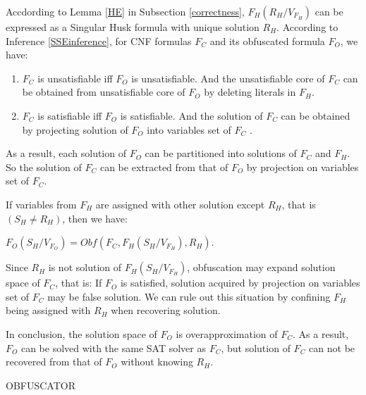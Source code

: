 \documentclass[conference,compsocconf]{IEEEtran}
\begin{document}
Accdording to Lemma \ref{HE} in Subsection \ref{correctness}, 
$F_H(R_H/V_{F_H})$ can be expressed as a Singular Husk formula with unique solution $R_H$.
According to Inference \ref{SSEinference}, for CNF formulas $F_C$  and its obfuscated formula $F_O$, we have:
\begin{enumerate}
 \item $F_C$  is unsatisfiable iff $F_O$ is unsatisfiable.
 And the unsatisfiable core of $F_C$  can be obtained from unsatisfiable core of $F_O$ by deleting literals in $F_H$.
 \item $F_C$  is satisfiable iff $F_O$ is satisfiable.
 And the solution of $F_C$  can be obtained by projecting solution of $F_O$ into variables set of $F_C$ .
\end{enumerate}

As a result, each solution of $F_O$ can be partitioned into solutions of $F_C$ and $F_H$. So
the solution of $F_C$ can be extracted from that of $F_O$ by projection on variables set of $F_C$.

If variables from $F_H$ are assigned with other solution except $R_H$, that is $(S_H\neq R_H)$, then we have:

$F_O(S_H/V_{F_O})
=Obf(F_C,F_H(S_H/V_{F_H}),R_H)$.

Since $R_H$ is not solution of $F_H(S_H/V_{F_H})$, obfuscation may expand solution space of $F_C$, that is:
If $F_O$ is satisfied, solution acquired by projection on variables set of $F_C$ may be false solution.
We can rule out this situation by confining $F_H$ being assigned with $R_H$ when recovering solution.

In conclusion, the solution space of $F_O$ is overapproximation of $F_C$.
As a result,
$F_O$ can be solved with the same SAT solver as $F_C$, 
but solution of $F_C$ can not be recovered from that of $F_O$ without knowing $R_H$.

\begin{algorithm}[t]
{}
\caption{OBFUSCATOR}
\label{algo_obs}
\end{algorithm}
\end{document}
